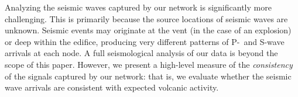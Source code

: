 Analyzing the seismic waves captured by our network is
significantly more challenging. This is primarily because the 
source locations of seismic waves are unknown. 
Seismic events may originate at the vent (in the case of an explosion)
or deep within the edifice, producing very different patterns of
P-~and S-wave arrivals at each node. A full seismological analysis
of our data is beyond the scope of this paper. However, we 
present a high-level measure of the {\em consistency} of the 
signals captured by our network: that is, we evaluate whether
the seismic wave arrivals are consistent with expected volcanic
activity.


